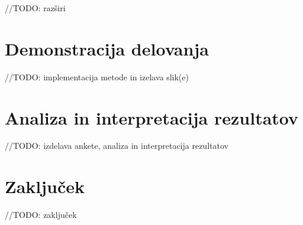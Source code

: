 \documentclass[a4paper, 12pt]{book}
\begin{document}
//TODO: razširi


\chapter{Demonstracija delovanja}
\label{demonstracija}

//TODO: implementacija metode in izelava slik(e)


\chapter{Analiza in interpretacija rezultatov}
\label{analiza}

//TODO: izdelava ankete, analiza in interpretacija rezultatov


\chapter{Zaključek}
\label{zakljucek}

//TODO: zaključek


\newpage %
\ \\
\clearpage
{}


\end{document}
